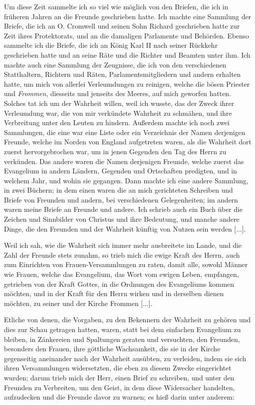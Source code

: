 Um diese Zeit sammelte ich so viel wie möglich von den
Briefen, die ich in früheren Jahren an die Freunde geschrieben
hatte. Ich machte eine Sammlung der Briefe, die ich an 
O. Cromwell und seinen Sohn Richard 
geschrieben hatte zur Zeit ihres
Protektorats, und an die damaligen Parlamente und Behörden.
Ebenso sammelte ich die Briefe, die ich an König Karl II nach
seiner Rückkehr geschrieben hatte und an seine Räte und die
Richter und Beamten unter ihm. Ich machte auch eine Sammlung 
der Zeugnisse, die ich von den verschiedenen Statthaltern,
Richtern und Räten, Parlamentsmitgliedern und andern erhalten
hatte, um mich von allerlei Verleumdungen zu reinigen, welche
die bösen Priester und \textit{Frommen}, diesseits und jenseits des
Meeres, auf mich geworfen hatten. Solches tat ich um der
Wahrheit willen, weil ich wusste, das der 
Zweck ihrer Verleumdung
war, die von mir verkündete Wahrheit zu schmähen, und ihre
Verbreitung unter den Leuten zu hindern. Außerdem machte ich
noch zwei Sammlungen, die eine war eine Liste oder ein 
Verzeichnis der Namen derjenigen Freunde, welche im Norden von
England aufgetreten waren, als die Wahrheit dort zuerst 
hervorgebrochen war, um in jenen Gegenden den Tag des Herrn zu
verkünden. Das andere waren die Namen derjenigen Freunde,
welche zuerst das Evangelium in andern Ländern, Gegenden und
Ortschaften predigten, und in welchem Jahr, und wohin sie gegangen. 
Dann machte ich eine andere Sammlung, in zwei Büchern;
in dem einen waren die an mich gerichteten Schreiben und Briefe
von Freunden und andern, bei verschiedenen Gelegenheiten; im
andern waren meine Briefe an Freunde und andere. Ich schrieb
auch ein Buch über die Zeichen und Sinnbilder von Christus
und ihre Bedeutung, und manche andere Dinge, die den Freunden
und der Wahrheit künftig von Nutzen sein werden [...].

Weil ich sah, wie die Wahrheit sich immer mehr ausbreitete
im Lande, und die Zahl der Freunde stets zunahm, so trieb mich
die ewige Kraft des Herrn, auch zum Einrichten von Frauen-Versammlungen 
zu raten, damit alle, sowohl Männer wie Frauen,
welche das Evangelium, das Wort vom ewigen Leben, empfangen,
getrieben von der Kraft Gottes, in die Ordnungen des Evangeliums 
kommen möchten, und in der Kraft für den Herrn wirken
und in derselben dienen möchten, zu seiner und der Kirche
Frommen [...].

Etliche von denen, die Vorgaben, zu den Bekennern der
Wahrheit zu gehören und dies zur Schau getragen hatten,
waren, statt bei dem einfachen Evangelium zu bleiben, in
Zänkereien und Spaltungen 
geraten und versuchten, den Freunden,
besonders den Frauen, ihre göttliche Wachsamkeit, die sie in der
Kirche gegenseitig aneinander nach der Wahrheit ausübten, zu
verleiden, indem sie sich ihren Versammlungen widersetzten, die
eben zu diesem Zwecke eingerichtet wurden; darum trieb mich der
Herr, einen Brief zu schreiben, und unter den Freunden zu 
Verbreiten, um den Geist, in dem diese Widersacher handelten, 
aufzudecken und die Freunde davor zu warnen; es hieß darin
unter anderem:

